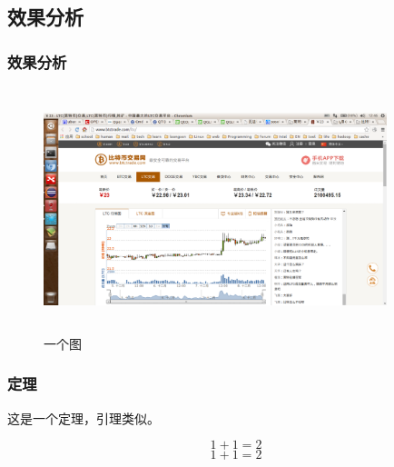 \documentclass{beamer}
\begin{document}
\begin{CJK}{UTF8}{gbsn}
	\section{效果分析}
    \begin{frame}
        \frametitle{效果分析}\pause
		\begin{figure}[!htbp]
			\centering
			\includegraphics[width=10.00cm,height=7.10cm]{test.eps}
			\caption{一个图}
		\end{figure}
    \end{frame}

	\begin{frame}
		\frametitle{定理}
		\begin{lemma}[1]
		这是一个定理，引理类似。
		\end{lemma}
		\pause                       %
		\begin{displaymath}             %
		1+1=2
		\end{displaymath}
		\begin{equation}
		1+1=2
		\end{equation}
	\end{frame}


\end{CJK}
\end{document}
